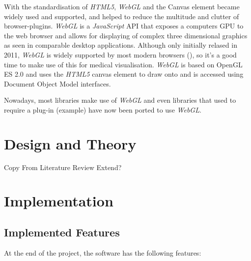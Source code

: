 \documentclass[a4paper,11pt,titlepage]{article}
\begin{document}
With the standardisation of \textit{HTML5}, \textit{WebGL} and the Canvas element became widely used and supported, and helped to reduce the multitude and clutter of browser-plugins. \textit{WebGL} is a \textit{JavaScript} API that exposes a computers GPU to the web browser and allows for displaying of complex three dimensional graphics as seen in comparable desktop applications. Although only initially relased in 2011, \textit{WebGL} is widely supported by most modern browsers (\cite{webGL}), so it's a good time to make use of this for medical visualisation. \textit{WebGL} is based on OpenGL ES 2.0 and uses the \textit{HTML5} canvas element to draw onto and is accessed using Document Object Model interfaces.

Nowadays, most libraries make use of \textit{WebGL} and even libraries that used to require a plug-in (example) have now been ported to use \textit{WebGL}. 











\section{Design and Theory}

Copy From Literature Review
Extend?


\section{Implementation}

\subsection{Implemented Features}

At the end of the project, the software has the following features:
\end{document}
